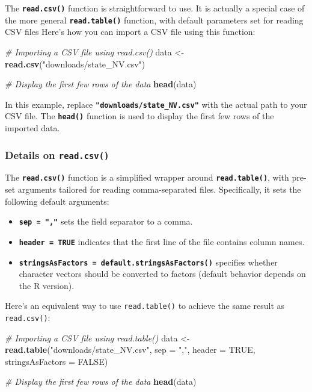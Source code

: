 \documentclass[
]{book}
\newenvironment{Shaded}{\begin{snugshade}}{\end{snugshade}}
\newcommand{\AttributeTok}[1]{\textcolor[rgb]{0.13,0.29,0.53}{#1}}
\newcommand{\CommentTok}[1]{\textcolor[rgb]{0.56,0.35,0.01}{\textit{#1}}}
\newcommand{\ConstantTok}[1]{\textcolor[rgb]{0.56,0.35,0.01}{#1}}
\newcommand{\FunctionTok}[1]{\textcolor[rgb]{0.13,0.29,0.53}{\textbf{#1}}}
\newcommand{\NormalTok}[1]{#1}
\newcommand{\OtherTok}[1]{\textcolor[rgb]{0.56,0.35,0.01}{#1}}
\newcommand{\StringTok}[1]{\textcolor[rgb]{0.31,0.60,0.02}{#1}}
\providecommand{\tightlist}{%
  \setlength{\itemsep}{0pt}\setlength{\parskip}{0pt}}
\begin{document}
The \textbf{\texttt{read.csv()}} function is straightforward to use. It is actually a special case of the more general \textbf{\texttt{read.table()}} function, with default parameters set for reading CSV files Here's how you can import a CSV file using this function:

\begin{Shaded}
\begin{Highlighting}[]
\CommentTok{\# Importing a CSV file using read.csv()}
\NormalTok{data }\OtherTok{\textless{}{-}} \FunctionTok{read.csv}\NormalTok{(}\StringTok{"downloads/state\_NV.csv"}\NormalTok{)}

\CommentTok{\# Display the first few rows of the data}
\FunctionTok{head}\NormalTok{(data)}
\end{Highlighting}
\end{Shaded}

In this example, replace \textbf{\texttt{"downloads/state\_NV.csv"}} with the actual path to your CSV file. The \textbf{\texttt{head()}} function is used to display the first few rows of the imported data.

\subsubsection*{\texorpdfstring{Details on \texttt{read.csv()}}{Details on read.csv()}}\label{details-on-read.csv}

The \textbf{\texttt{read.csv()}} function is a simplified wrapper around \textbf{\texttt{read.table()}}, with pre-set arguments tailored for reading comma-separated files. Specifically, it sets the following default arguments:

\begin{itemize}
\tightlist
\item
  \textbf{\texttt{sep\ =\ ","}} sets the field separator to a comma.
\item
  \textbf{\texttt{header\ =\ TRUE}} indicates that the first line of the file contains column names.
\item
  \textbf{\texttt{stringsAsFactors\ =\ default.stringsAsFactors()}} specifies whether character vectors should be converted to factors (default behavior depends on the R version).
\end{itemize}

Here's an equivalent way to use \texttt{read.table()} to achieve the same result as \texttt{read.csv()}:

\begin{Shaded}
\begin{Highlighting}[]
\CommentTok{\# Importing a CSV file using read.table()}
\NormalTok{data }\OtherTok{\textless{}{-}} \FunctionTok{read.table}\NormalTok{(}\StringTok{"downloads/state\_NV.csv"}\NormalTok{, }\AttributeTok{sep =} \StringTok{","}\NormalTok{, }\AttributeTok{header =} \ConstantTok{TRUE}\NormalTok{, }\AttributeTok{stringsAsFactors =} \ConstantTok{FALSE}\NormalTok{)}

\CommentTok{\# Display the first few rows of the data}
\FunctionTok{head}\NormalTok{(data)}
\end{Highlighting}
\end{Shaded}
\end{document}
